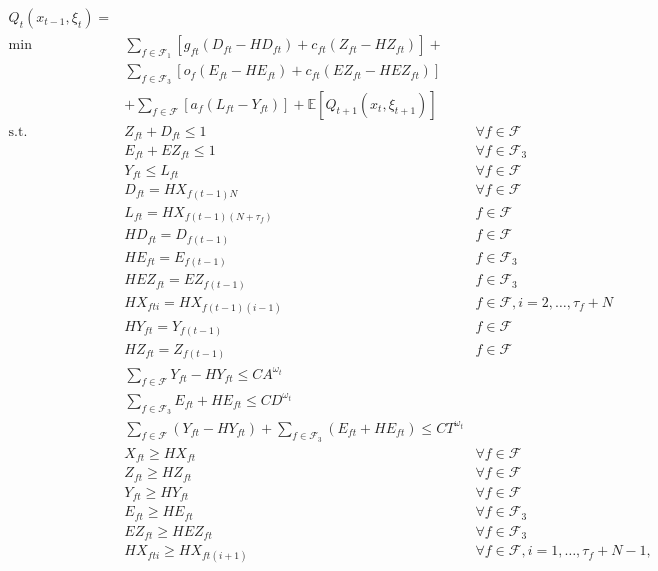 \documentclass[12pt]{article}
\begin{document}
	\begin{subequations}
		\begin{align}
		Q_t(x_{t-1}, \xi_t)  = & &\\
		\min \quad & \sum_{f \in \mathcal{F}_1} \left[ g_{ft} (D_{ft} - HD_{ft}) + c_{ft} (Z_{ft} - HZ_{ft}) \right]  + & \nonumber \\
		& \sum_{f \in \mathcal{F}_3} \left[ o_f(E_{ft} - HE_{ft}) + c_{ft}(EZ_{ft} - HEZ_{ft}) \right]& \nonumber\\ 
		& +\sum_{f \in \mathcal{F}} \left[ a_f (L_{ft} - Y_{ft})\right]  + \mathbb{E}\left[Q_{t+1}(x_{t},\xi_{t+1}) \right] &\\
		\text{s.t.} \quad & Z_{ft} + D_{ft} \leq 1 & \forall f \in \mathcal{F} \label{cons:cancelORTOt}\\
		& E_{ft} + EZ_{ft} \leq 1 & \forall f \in \mathcal{F}_3 \label{cons:cancelTO2t}\\
		& Y_{ft} \leq L_{ft} & \forall f \in \mathcal{F} \label{cons:arrlandt}\\
		& D_{ft} = HX_{f(t-1)N} & \forall f \in \mathcal{F} \label{cons:TOHistt1}\\
		& L_{ft} = HX_{f(t-1)(N+\tau_{f})}& f \in \mathcal{F} \label{cons:landHistt}\\
		& HD_{ft} = D_{f(t-1)} & f \in \mathcal{F} \label{cons:TOHistt2}\\
		& HE_{ft} = E_{f(t-1)} & f \in \mathcal{F}_3 \label{cons:TO2Histt}\\
		& HEZ_{ft} = EZ_{f(t-1)} & f \in \mathcal{F}_3 \label{cons:cancelTO2Histt}\\
		& HX_{fti} = HX_{f(t-1)(i-1)} & f \in \mathcal{F}, i = 2, \dots, \tau_{f} + N \label{cons:planHistt}\\
		& HY_{ft} = Y_{f(t-1)} & f \in \mathcal{F} \label{cons:arrHistt}\\
		& HZ_{ft} = Z_{f(t-1)} & f \in \mathcal{F} \label{cons:cancelHistt}\\
		& \sum_{f \in \mathcal{F}} Y_{ft} - HY_{ft} \leq CA^{\omega_t} & \label{cons:arrCapt}\\
		& \sum_{f \in \mathcal{F}_3} E_{ft} + HE_{ft} \leq CD^{\omega_t} &\label{cons:deptCapt}\\
		& \sum_{f \in \mathcal{F}} (Y_{ft} - HY_{ft}) + \sum_{f \in \mathcal{F}_3} (E_{ft} + HE_{ft}) \leq CT^{\omega_t} & \label{cons:totCapt}\\
		& X_{ft} \geq HX_{ft} & \forall f \in \mathcal{F} \label{cons:transXt}\\
		& Z_{ft} \geq HZ_{ft} & \forall f \in \mathcal{F} \label{cons:transZt}\\
		& Y_{ft} \geq HY_{ft} & \forall f \in \mathcal{F} \label{cons:transYt}\\
		& E_{ft} \geq HE_{ft} & \forall f \in \mathcal{F}_3 \label{cons:transEt}\\
		& EZ_{ft} \geq HEZ_{ft} & \forall f \in \mathcal{F}_3 \label{cons:transEZt}\\
		& HX_{fti} \geq HX_{ft(i+1)} & \forall f \in \mathcal{F}, i = 1, \dots, \tau_{f} + N -1, \label{cons:transHXt}
		\end{align}
	\end{subequations}
\end{document}
